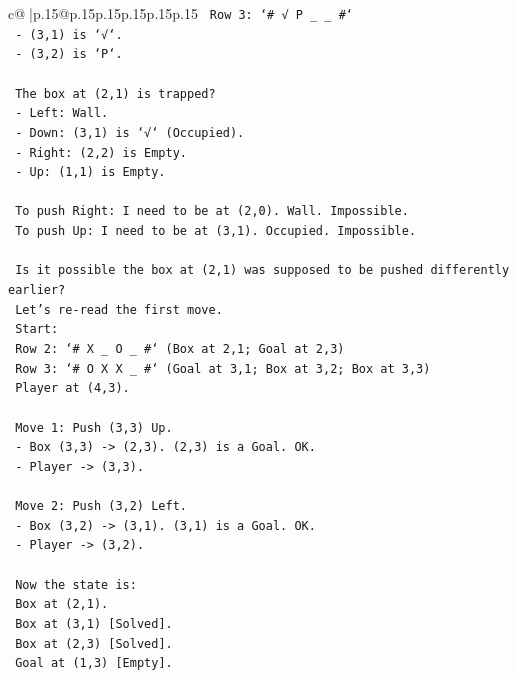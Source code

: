 \documentclass{article}
\begin{document}
{\begin{supertabular}{c@{$\;$}|p{.15\linewidth}@{}p{.15\linewidth}p{.15\linewidth}p{.15\linewidth}p{.15\linewidth}p{.15\linewidth}}
{{{\texttt{    Row 3: `\# √ P \_ \_ \#`} \\
\texttt{    {-} (3,1) is `√`.} \\
\texttt{    {-} (3,2) is `P`.} \\
\\ 
\texttt{    The box at (2,1) is trapped?} \\
\texttt{    {-} Left: Wall.} \\
\texttt{    {-} Down: (3,1) is `√` (Occupied).} \\
\texttt{    {-} Right: (2,2) is Empty.} \\
\texttt{    {-} Up: (1,1) is Empty.} \\
\\ 
\texttt{    To push Right: I need to be at (2,0). Wall. Impossible.} \\
\texttt{    To push Up: I need to be at (3,1). Occupied. Impossible.} \\
\\ 
\texttt{    Is it possible the box at (2,1) was supposed to be pushed differently earlier?} \\
\texttt{    Let's re{-}read the first move.} \\
\texttt{    Start:} \\
\texttt{    Row 2: `\# X \_ O \_ \#` (Box at 2,1; Goal at 2,3)} \\
\texttt{    Row 3: `\# O X X \_ \#` (Goal at 3,1; Box at 3,2; Box at 3,3)} \\
\texttt{    Player at (4,3).} \\
\\ 
\texttt{    Move 1: Push (3,3) Up.} \\
\texttt{    {-} Box (3,3) {-}> (2,3). (2,3) is a Goal. OK.} \\
\texttt{    {-} Player {-}> (3,3).} \\
\\ 
\texttt{    Move 2: Push (3,2) Left.} \\
\texttt{    {-} Box (3,2) {-}> (3,1). (3,1) is a Goal. OK.} \\
\texttt{    {-} Player {-}> (3,2).} \\
\\ 
\texttt{    Now the state is:} \\
\texttt{    Box at (2,1).} \\
\texttt{    Box at (3,1) {[}Solved{]}.} \\
\texttt{    Box at (2,3) {[}Solved{]}.} \\
\texttt{    Goal at (1,3) {[}Empty{]}.} \\
}}}
\end{supertabular}}
\end{document}

